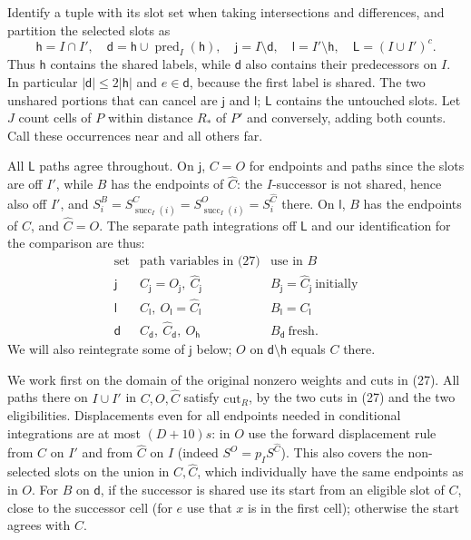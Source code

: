 Identify a tuple with its slot set when taking intersections and
differences, and partition the selected slots as
\[
 \mathsf h=I\cap I',\quad
 \mathsf d=\mathsf h\cup\operatorname{pred}_I(\mathsf h),\quad
 \mathsf j=I\setminus\mathsf d,\quad
 \mathsf l=I'\setminus\mathsf h,\quad
 \mathsf L=(I\cup I')^c .
\]
Thus $\mathsf h$ contains the shared labels, while $\mathsf d$ also
contains their predecessors on $I$. In particular
\(|\mathsf d|\le2|\mathsf h|\) and $e\in\mathsf d$, because the
first label is shared. The two unshared portions that can cancel are
$\mathsf j$ and $\mathsf l$; $\mathsf L$ contains the untouched slots.
Let $J$ count cells of $P$ within distance $R_*$ of $P'$ and conversely,
adding both counts. Call these occurrences near and all others far.

All \(\mathsf L\) paths agree throughout. On \(\mathsf j\), \(C=O\) for endpoints and paths since the slots are off \(I'\), while \(B\) has the endpoints of \(\widehat C\): the \(I\)-successor is not shared, hence also off \(I'\), and \(S_i^B=S_{\operatorname{succ}_I(i)}^C=S_{\operatorname{succ}_I(i)}^O=S_i^{\widehat C}\) there. On \(\mathsf l\), \(B\) has the endpoints of \(C\), and \(\widehat C=O\). The separate path integrations off \(\mathsf L\) and our identification for the comparison are thus:
\[
\begin{array}{c|l|l}
 \text{set} & \text{path variables in (27)} & \text{use in }B\\ \hline
 \mathsf j & C_{\mathsf j}=O_{\mathsf j},\ \widehat C_{\mathsf j}
            & B_{\mathsf j}=\widehat C_{\mathsf j}\ \text{initially}\\
 \mathsf l & C_{\mathsf l},\ O_{\mathsf l}=\widehat C_{\mathsf l}
            & B_{\mathsf l}=C_{\mathsf l}\\
 \mathsf d & C_{\mathsf d},\ \widehat C_{\mathsf d},\ O_{\mathsf h}
            & B_{\mathsf d}\ \text{fresh}.
\end{array}
\]
We will also reintegrate some of \(\mathsf j\) below; \(O\) on \(\mathsf d\setminus\mathsf h\) equals \(C\) there.

We work first on the domain of the original nonzero weights and cuts in (27). All paths there on \(I\cup I'\) in \(C,O,\widehat C\) satisfy \(\mathrm{cut}_R\), by the two cuts in (27) and the two eligibilities. Displacements even for all endpoints needed in conditional integrations are at most \((D+10)s\): in \(O\) use the forward displacement rule from \(C\) on \(I'\) and from \(\widehat C\) on \(I\) (indeed \(S^O=p_I S^{\widehat C}\)). This also covers the non-selected slots on the union in \(C,\widehat C\), which individually have the same endpoints as in \(O\). For \(B\) on \(\mathsf d\), if the successor is shared use its start from an eligible slot of \(C\), close to the successor cell (for \(e\) use that \(x\) is in the first cell); otherwise the start agrees with \(\widehat C\).

